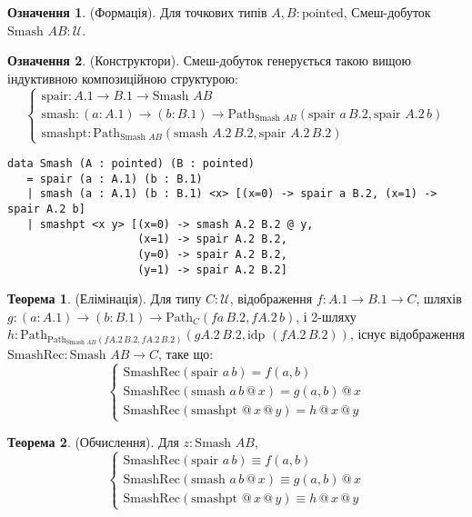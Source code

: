\documentclass{article}
\theoremstyle{definition}
\newtheorem{theorem}{Теорема}
\newtheorem{definition}{Означення}
\begin{document}
\begin{definition} (Формація).
Для точкових типів \( A, B : \text{pointed} \), Смеш-добуток \( \text{Smash } A B : \mathcal{U} \).
\end{definition}

\begin{definition} (Конструктори).
Смеш-добуток генерується такою вищою індуктивною композиційною структурою:
\[
\begin{cases}
\text{spair} : A.1 \to B.1 \to \text{Smash } A B \\
\text{smash} : (a : A.1) \to (b : B.1) \to \text{Path}_{\text{Smash } A B} (\text{spair } a \, B.2, \text{spair } A.2 \, b) \\
\text{smashpt} : \text{Path}_{\text{Smash } A B} (\text{smash } A.2 \, B.2, \text{spair } A.2 \, B.2)
\end{cases}
\]
\begin{lstlisting}
data Smash (A : pointed) (B : pointed)
   = spair (a : A.1) (b : B.1)
   | smash (a : A.1) (b : B.1) <x> [(x=0) -> spair a B.2, (x=1) -> spair A.2 b]
   | smashpt <x y> [(x=0) -> smash A.2 B.2 @ y,
                    (x=1) -> spair A.2 B.2,
                    (y=0) -> spair A.2 B.2,
                    (y=1) -> spair A.2 B.2]
\end{lstlisting}
\end{definition}

\begin{theorem} (Елімінація).
Для типу \( C : \mathcal{U} \), відображення \( f : A.1 \to B.1 \to C \),
шляхів \( g : (a : A.1) \to (b : B.1) \to \text{Path}_C (f a \, B.2, f A.2 \, b) \),
і 2-шляху \( h : \text{Path}_{\text{Path}_{\text{Smash } A B} (f A.2 \, B.2, f A.2 \, B.2)} (g A.2 \, B.2, \text{idp } (f A.2 \, B.2)) \),
існує відображення \( \text{SmashRec} : \text{Smash } A B \to C \), таке що:
\[
\begin{cases}
\text{SmashRec}(\text{spair } a \, b) = f(a, b) \\
\text{SmashRec}(\text{smash } a \, b \, @ \, x) = g(a, b) \, @ \, x \\
\text{SmashRec}(\text{smashpt } @ \, x \, @ \, y) = h \, @ \, x \, @ \, y
\end{cases}
\]
\end{theorem}

\begin{theorem} (Обчислення).
Для \( z : \text{Smash } A B \),
\[
\begin{cases}
\text{SmashRec}(\text{spair } a \, b) \equiv f(a, b) \\
\text{SmashRec}(\text{smash } a \, b \, @ \, x) \equiv g(a, b) \, @ \, x \\
\text{SmashRec}(\text{smashpt } @ \, x \, @ \, y) \equiv h \, @ \, x \, @ \, y
\end{cases}
\]
\end{theorem}
\end{document}
